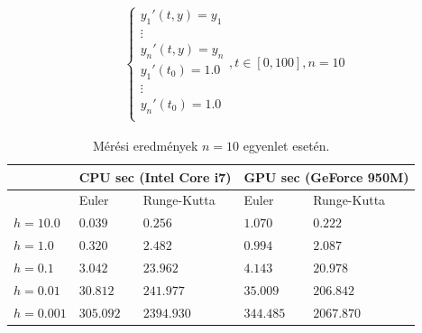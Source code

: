 \begin{align}
	\begin{cases}
		y_{1}'(t, y) = y_{1} \\
		\vdots \\
		y_{n}'(t, y) = y_{n}\\
		y_{1}'(t_{0}) = 1.0 \\
		\vdots \\
		y_{n}'(t_{0}) = 1.0\\
	\end{cases}
	, t\in[0, 100], n = 10
\end{align}

\begin{table}[h!]
	\centering
	\begin{tabular}{ | p{1.8cm} | p{2.5cm} | p{2.5cm} | p{2.5cm} | p{2.5cm} |}
		\hline  & \multicolumn{2}{|c|}{\textbf{CPU sec (Intel Core i7)}} & \multicolumn{2}{|c|}{\textbf{GPU sec (GeForce 950M)}}\\ 
		\hline  & Euler & Runge-Kutta & Euler & Runge-Kutta\\ 
		\hline
		$ h = 10.0 $ & $ 0.039 $ & $ 0.256 $ & $ 1.070 $ & $ 0.222 $ \\ 
		\hline
		$ h = 1.0 $ & $ 0.320 $ & $ 2.482 $ & $ 0.994 $ & $ 2.087 $ \\
		\hline
		$ h = 0.1 $ & $ 3.042 $ & $ 23.962 $ & $ 4.143 $ & $ 20.978 $ \\
		\hline
		$ h = 0.01 $ & $ 30.812 $ & $ 241.977 $ & $ 35.009 $ & $ 206.842 $ \\
		\hline
		$ h = 0.001 $ & $ 305.092 $ & $ 2394.930 $ & $ 344.485 $ & $ 2067.870 $ \\
		\hline
	\end{tabular}
	\caption{Mérési eredmények $ n = 10 $ egyenlet esetén.}
\end{table}

